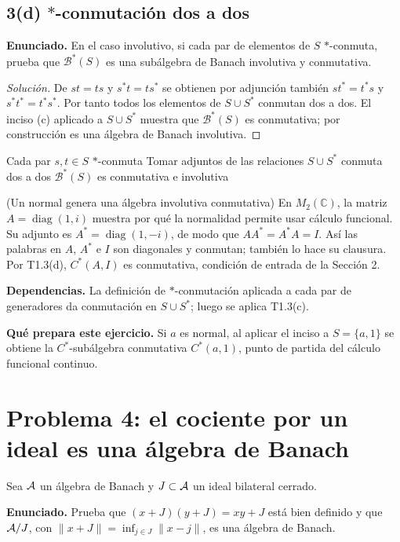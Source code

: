 \subsection*{3(d) $*$-conmutación dos a dos}

\noindent\textbf{Enunciado.} En el caso involutivo, si cada par de elementos de $S$ $*$-conmuta, prueba que $\mathcal B^*(S)$ es una subálgebra de Banach involutiva y conmutativa.

\begin{proof}[Solución]
De $st=ts$ y $s^*t=ts^*$ se obtienen por adjunción también
$st^*=t^*s$ y $s^*t^*=t^*s^*$. Por tanto todos los elementos de $S\cup S^*$ conmutan dos a dos.
El inciso (c) aplicado a $S\cup S^*$ muestra que $\mathcal B^*(S)$ es conmutativa; por construcción
es una álgebra de Banach involutiva.
\end{proof}

\proofdiagram
{Cada par $s,t\in S$ $*$-conmuta}
{Tomar adjuntos de las relaciones}
{$S\cup S^*$ conmuta dos a dos}
{$\mathcal B^*(S)$ es conmutativa e involutiva}

\begin{cthejemplo}{(Un normal genera una álgebra involutiva conmutativa)}
En $M_2(\mathbb C)$, la matriz $A=\operatorname{diag}(1,i)$ muestra por qué
la normalidad permite usar cálculo funcional.
Su adjunto es $A^*=\operatorname{diag}(1,-i)$, de modo que $AA^*=A^*A=I$.
Así las palabras en $A$, $A^*$ e $I$ son diagonales y conmutan; también lo hace su clausura.
Por T1.3(d), $C^*(A,I)$ es conmutativa, condición de entrada de la Sección 2.
\end{cthejemplo}

\noindent\textbf{Dependencias.} La definición de $*$-conmutación aplicada a cada par de generadores da conmutación en $S\cup S^*$; luego se aplica T1.3(c).

\noindent\textbf{Qué prepara este ejercicio.} Si $a$ es normal, al aplicar el inciso a $S=\{a,1\}$ se obtiene la $C^*$-subálgebra conmutativa $C^*(a,1)$, punto de partida del cálculo funcional continuo.

\section{Problema 4: el cociente por un ideal es una álgebra de Banach}

Sea $\mathcal A$ un álgebra de Banach y $J\subset\mathcal A$ un ideal bilateral cerrado.

\noindent\textbf{Enunciado.} Prueba que $(x+J)(y+J)=xy+J$ está bien definido y que $\mathcal A/J$, con $\|x+J\|=\inf_{j\in J}\|x-j\|$, es una álgebra de Banach.

